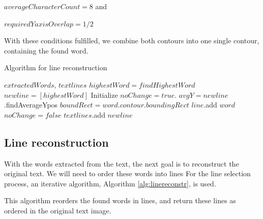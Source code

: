 \documentclass{article}
\begin{document}
\noindent 
$averageCharacterCount = 8$ and

\noindent
$requiredYaxisOverlap = 1/2$

With these conditions fulfilled, we combine both contours into one single contour, containing the found word.

\begin{algorithm}[tb]
   \caption{Algorithm for line reconstruction}
   \label{alg:linereconstr}
\begin{algorithmic}
    $extractedWords$, $textlines$
   \REPEAT
        \STATE $highestWord = findHighestWord $
        \STATE $newline = [highestWord]$
        \STATE Initialize $noChange = true$.
        \STATE $avgY= newline$.findAverageYpos
        \REPEAT
            \STATE $boundRect = word.contour.boundingRect$
            \STATE $line$.add $word$
            \STATE $noChange = false$
            \ENDIF
        \ENDFOR
        \STATE $textlines$.add $newline$
\end{algorithmic}
\end{algorithm}

\subsection{Line reconstruction}
With the words extracted from the text, the next goal is to reconstruct the original text.
We will need to order these words into lines 
For the line selection process, an iterative algorithm, Algorithm \ref{alg:linereconstr}, is used.

This algorithm reorders the found words in lines, and return these lines as ordered in the original text image.
\end{document}
